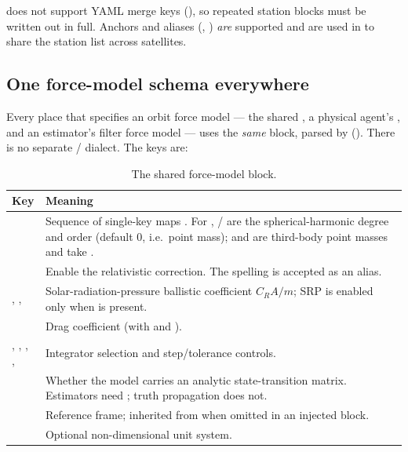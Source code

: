 \begin{lupntwarning}
 does not support YAML merge keys (\code{<<:}), so repeated station
blocks must be written out in full. Anchors and aliases (, )
\emph{are} supported and are used in
 to share the station list across
satellites.
\end{lupntwarning}

\subsection{One force-model schema everywhere}
\label{sec:sim-force-model}

Every place that specifies an orbit force model --- the shared
, a physical agent's , and an
estimator's filter force model --- uses the \emph{same} block, parsed by
 ().
There is no separate  / 
dialect. The keys are:

\begin{table}[H]
  \centering
  \caption{The shared force-model block.}
  \label{tab:sim-force-model}
  \begin{tabularx}{\textwidth}{@{}l L@{}}
    \toprule
    Key & Meaning \\
    \midrule
     & Sequence of single-key maps . For
      , / are the spherical-harmonic degree and order
      (default $0$, i.e.\ point mass);  and  are third-body
      point masses and take \code{\{\}}. \\
     & Enable the relativistic correction. The spelling
       is accepted as an alias. \\
    , ,  & Solar-radiation-pressure ballistic
      coefficient $C_R A / m$; SRP is enabled only when  is present. \\
     & Drag coefficient (with  and ). \\
    , , , ,  &
      Integrator selection and step/tolerance controls. \\
     & Whether the model carries an analytic state-transition
      matrix. Estimators need ; truth propagation does not. \\
     & Reference frame; inherited from  when
      omitted in an injected block. \\
     & Optional non-dimensional unit system. \\
    \bottomrule
  \end{tabularx}
\end{table}

